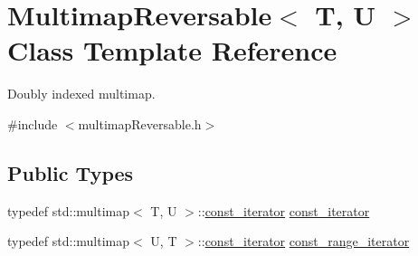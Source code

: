 \hypertarget{classMultimapReversable}{}\section{Multimap\+Reversable$<$ T, U $>$ Class Template Reference}
\label{classMultimapReversable}


Doubly indexed multimap.  




{\ttfamily \#include $<$multimap\+Reversable.\+h$>$}

\subsection*{Public Types}
\begin{DoxyCompactItemize}
\item 
typedef std\+::multimap$<$ T, U $>$\+::\hyperlink{classMultimapReversable_ac747a36aa9a030bec3d2149d97047de5}{const\+\_\+iterator} \hyperlink{classMultimapReversable_ac747a36aa9a030bec3d2149d97047de5}{const\+\_\+iterator}
\item 
typedef std\+::multimap$<$ U, T $>$\+::\hyperlink{classMultimapReversable_ac747a36aa9a030bec3d2149d97047de5}{const\+\_\+iterator} \hyperlink{classMultimapReversable_ae87bcf568586e240e0d294050fa248cb}{const\+\_\+range\+\_\+iterator}
\end{DoxyCompactItemize}
